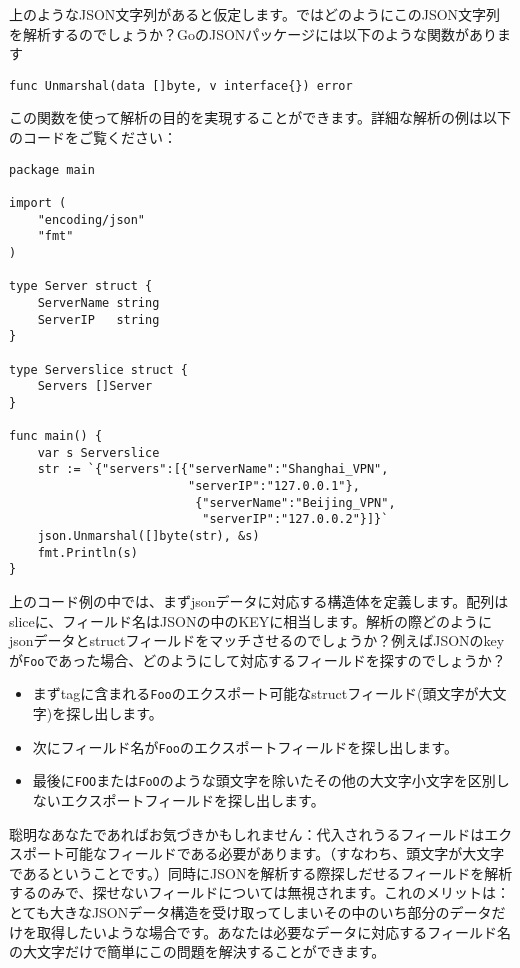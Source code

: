 上のようなJSON文字列があると仮定します。ではどのようにこのJSON文字列を解析するのでしょうか？GoのJSONパッケージには以下のような関数があります

\begin{lstlisting}[numbers=none]
func Unmarshal(data []byte, v interface{}) error
\end{lstlisting}

この関数を使って解析の目的を実現することができます。詳細な解析の例は以下のコードをご覧ください：

\begin{lstlisting}[numbers=none]
package main

import (
    "encoding/json"
    "fmt"
)

type Server struct {
    ServerName string
    ServerIP   string
}

type Serverslice struct {
    Servers []Server
}

func main() {
    var s Serverslice
    str := `{"servers":[{"serverName":"Shanghai_VPN",
                         "serverIP":"127.0.0.1"},
                          {"serverName":"Beijing_VPN",
                           "serverIP":"127.0.0.2"}]}`
    json.Unmarshal([]byte(str), &s)
    fmt.Println(s)
}
\end{lstlisting}



上のコード例の中では、まずjsonデータに対応する構造体を定義します。配列はsliceに、フィールド名はJSONの中のKEYに相当します。解析の際どのようにjsonデータとstructフィールドをマッチさせるのでしょうか？例えばJSONのkeyが\texttt{Foo}であった場合、どのようにして対応するフィールドを探すのでしょうか？

\begin{itemize}
  \item まずtagに含まれる\texttt{Foo}のエクスポート可能なstructフィールド(頭文字が大文字)を探し出します。
  \item 次にフィールド名が\texttt{Foo}のエクスポートフィールドを探し出します。
  \item 最後に\texttt{FOO}または\texttt{FoO}のような頭文字を除いたその他の大文字小文字を区別しないエクスポートフィールドを探し出します。
\end{itemize}

聡明なあなたであればお気づきかもしれません：代入されうるフィールドはエクスポート可能なフィールドである必要があります。（すなわち、頭文字が大文字であるということです。）同時にJSONを解析する際探しだせるフィールドを解析するのみで、探せないフィールドについては無視されます。これのメリットは：とても大きなJSONデータ構造を受け取ってしまいその中のいち部分のデータだけを取得したいような場合です。あなたは必要なデータに対応するフィールド名の大文字だけで簡単にこの問題を解決することができます。
